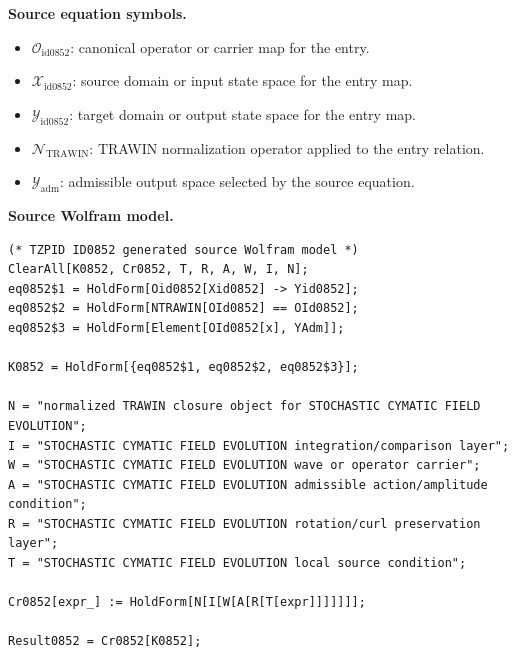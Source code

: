 \begin{minipage}[t]{0.49\linewidth}
\begingroup
\small
\raggedright
\textbf{Source equation symbols.}\par
\begin{itemize}[leftmargin=1.35em,itemsep=1pt,topsep=1pt,parsep=0pt]
    \item $\mathcal{O}_{\mathrm{id0852}}$: canonical operator or carrier map for the entry.
    \item $\mathcal{X}_{\mathrm{id0852}}$: source domain or input state space for the entry map.
    \item $\mathcal{Y}_{\mathrm{id0852}}$: target domain or output state space for the entry map.
    \item $\mathcal{N}_{\mathrm{TRAWIN}}$: TRAWIN normalization operator applied to the entry relation.
    \item $\mathcal{Y}_{\mathrm{adm}}$: admissible output space selected by the source equation.
\end{itemize}
\endgroup
\end{minipage}\hfill
\begin{minipage}[t]{0.47\linewidth}
\begingroup
\scriptsize
\raggedright
\textbf{Source Wolfram model.}\par
\begin{Verbatim}[fontsize=\tiny,breaklines=true,breakanywhere=true]
(* TZPID ID0852 generated source Wolfram model *)
ClearAll[K0852, Cr0852, T, R, A, W, I, N];
eq0852$1 = HoldForm[Oid0852[Xid0852] -> Yid0852];
eq0852$2 = HoldForm[NTRAWIN[OId0852] == OId0852];
eq0852$3 = HoldForm[Element[OId0852[x], YAdm]];

K0852 = HoldForm[{eq0852$1, eq0852$2, eq0852$3}];

N = "normalized TRAWIN closure object for STOCHASTIC CYMATIC FIELD EVOLUTION";
I = "STOCHASTIC CYMATIC FIELD EVOLUTION integration/comparison layer";
W = "STOCHASTIC CYMATIC FIELD EVOLUTION wave or operator carrier";
A = "STOCHASTIC CYMATIC FIELD EVOLUTION admissible action/amplitude condition";
R = "STOCHASTIC CYMATIC FIELD EVOLUTION rotation/curl preservation layer";
T = "STOCHASTIC CYMATIC FIELD EVOLUTION local source condition";

Cr0852[expr_] := HoldForm[N[I[W[A[R[T[expr]]]]]]];

Result0852 = Cr0852[K0852];
\end{Verbatim}
\endgroup
\end{minipage}


